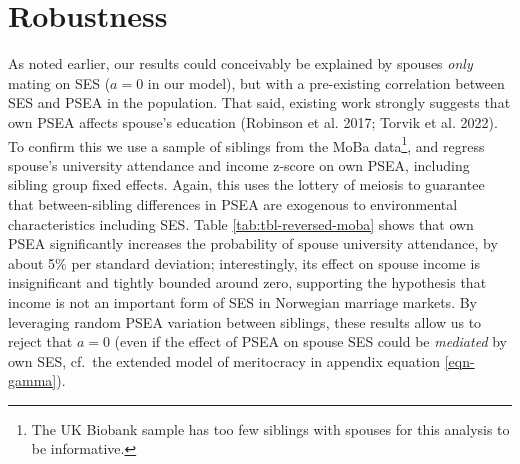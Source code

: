 \documentclass[
  12pt,
]{article}
\theoremstyle{definition}
\theoremstyle{definition}
\theoremstyle{definition}
\theoremstyle{definition}
\theoremstyle{remark}
\begin{document}
\FloatBarrier

\section{Robustness}\label{robustness}

As noted earlier, our results could conceivably be explained by spouses
\emph{only} mating on SES (\(a = 0\) in our model), but with a pre-existing
correlation between SES and PSEA in the population. That said, existing
work strongly suggests that own PSEA affects spouse's education
({Robinson et al.} 2017; {Torvik et al.} 2022). To confirm this we use a
sample of siblings from the MoBa data\footnote{The UK Biobank sample has too few siblings with spouses for this
  analysis to be informative.}, and regress spouse's
university attendance and income z-score on own PSEA, including sibling
group fixed effects. Again, this uses the lottery of meiosis to
guarantee that between-sibling differences in PSEA are exogenous to
environmental characteristics including SES. Table
\ref{tab:tbl-reversed-moba} shows that own PSEA significantly increases
the probability of spouse university attendance, by about 5\% per
standard deviation; interestingly, its effect on spouse income is
insignificant and tightly bounded around zero, supporting the hypothesis
that income is not an important form of SES in Norwegian marriage
markets. By leveraging random PSEA variation between siblings, these
results allow us to reject that \(a = 0\) (even if the effect of PSEA on
spouse SES could be \emph{mediated} by own SES, cf.~the extended model of
meritocracy in appendix equation \ref{eqn-gamma}).

 
  \providecommand{\huxb}[2]{\arrayrulecolor[RGB]{#1}\global\arrayrulewidth=#2pt}
  \providecommand{\huxvb}[2]{\color[RGB]{#1}\vrule width #2pt}
  \providecommand{\huxtpad}[1]{\rule{0pt}{#1}}
  \providecommand{\huxbpad}[1]{\rule[-#1]{0pt}{#1}}
\end{document}
